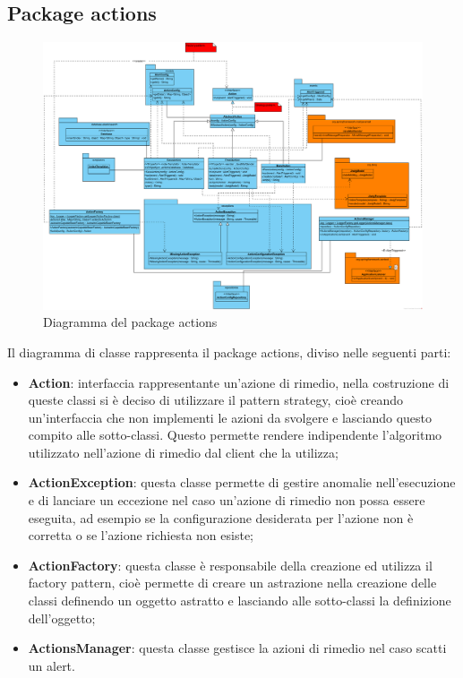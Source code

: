 \newpage

    \subsection{Package actions}

        \begin{figure}[htbp]
            \centering
            \includegraphics[width=\textwidth]{./img/DiagrammiClasse/actions.png}
            \caption[Diagramma del package actions]{Diagramma del package actions}
        \end{figure}
        Il diagramma di classe rappresenta il package actions, diviso nelle seguenti parti:
        \begin{itemize}
        	\item \textbf{Action}: interfaccia rappresentante un'azione di rimedio, nella costruzione di 
        		queste classi si è deciso di utilizzare il pattern strategy, cioè creando un'interfaccia 
        		che non implementi le azioni da svolgere e lasciando questo compito alle sotto-classi. 
        		Questo permette rendere indipendente l'algoritmo utilizzato nell'azione di rimedio dal
        		client che la utilizza;
        	\item \textbf{ActionException}: questa classe permette di gestire anomalie nell'esecuzione e di
        		lanciare un eccezione nel caso un'azione di rimedio non possa essere eseguita, ad esempio
        		se la configurazione desiderata per l'azione non è corretta o se l'azione richiesta non 
        		esiste;
        	\item \textbf{ActionFactory}: questa classe è responsabile della creazione ed utilizza il
        		factory pattern, cioè permette di creare un astrazione nella creazione delle classi 
        		definendo un oggetto astratto e lasciando alle sotto-classi la definizione dell'oggetto;
        	\item \textbf{ActionsManager}: questa classe gestisce la azioni di rimedio nel caso scatti un
        		alert.
        \end{itemize}

